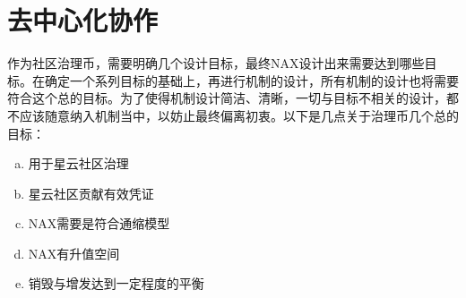 \section{去中心化协作}


作为社区治理币，需要明确几个设计目标，最终NAX设计出来需要达到哪些目标。在确定一个系列目标的基础上，再进行机制的设计，所有机制的设计也将需要符合这个总的目标。为了使得机制设计简洁、清晰，一切与目标不相关的设计，都不应该随意纳入机制当中，以妨止最终偏离初衷。以下是几点关于治理币几个总的目标：

\begin{enumerate}[a.]
        \item 用于星云社区治理
        \item 星云社区贡献有效凭证
        \item NAX需要是符合通缩模型
        \item NAX有升值空间
        \item 销毁与增发达到一定程度的平衡
\end{enumerate}